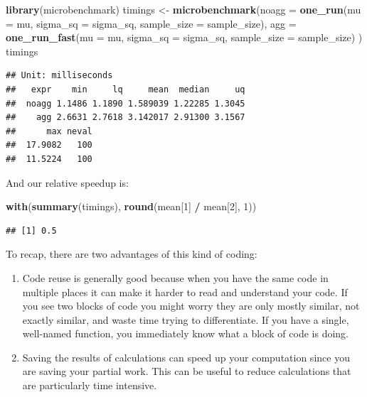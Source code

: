 \documentclass[
]{book}
\newenvironment{Shaded}{\begin{snugshade}}{\end{snugshade}}
\newcommand{\AttributeTok}[1]{\textcolor[rgb]{0.13,0.29,0.53}{#1}}
\newcommand{\DecValTok}[1]{\textcolor[rgb]{0.00,0.00,0.81}{#1}}
\newcommand{\FunctionTok}[1]{\textcolor[rgb]{0.13,0.29,0.53}{\textbf{#1}}}
\newcommand{\NormalTok}[1]{#1}
\newcommand{\OtherTok}[1]{\textcolor[rgb]{0.56,0.35,0.01}{#1}}
\newcommand{\SpecialCharTok}[1]{\textcolor[rgb]{0.81,0.36,0.00}{\textbf{#1}}}
\begin{document}
\begin{Shaded}
\begin{Highlighting}[]
\FunctionTok{library}\NormalTok{(microbenchmark)}
\NormalTok{timings }\OtherTok{\textless{}{-}} \FunctionTok{microbenchmark}\NormalTok{(}\AttributeTok{noagg =} \FunctionTok{one\_run}\NormalTok{(}\AttributeTok{mu =}\NormalTok{ mu, }\AttributeTok{sigma\_sq =}\NormalTok{ sigma\_sq, }
                                          \AttributeTok{sample\_size =}\NormalTok{ sample\_size),}
                          \AttributeTok{agg =} \FunctionTok{one\_run\_fast}\NormalTok{(}\AttributeTok{mu =}\NormalTok{ mu, }\AttributeTok{sigma\_sq =}\NormalTok{ sigma\_sq, }
                                             \AttributeTok{sample\_size =}\NormalTok{ sample\_size) )}
\NormalTok{timings}
\end{Highlighting}
\end{Shaded}

\begin{verbatim}
## Unit: milliseconds
##   expr    min     lq     mean  median     uq
##  noagg 1.1486 1.1890 1.589039 1.22285 1.3045
##    agg 2.6631 2.7618 3.142017 2.91300 3.1567
##      max neval
##  17.9082   100
##  11.5224   100
\end{verbatim}

And our relative speedup is:

\begin{Shaded}
\begin{Highlighting}[]
\FunctionTok{with}\NormalTok{(}\FunctionTok{summary}\NormalTok{(timings), }\FunctionTok{round}\NormalTok{(mean[}\DecValTok{1}\NormalTok{] }\SpecialCharTok{/}\NormalTok{ mean[}\DecValTok{2}\NormalTok{], }\DecValTok{1}\NormalTok{))}
\end{Highlighting}
\end{Shaded}

\begin{verbatim}
## [1] 0.5
\end{verbatim}

To recap, there are two advantages of this kind of coding:

\begin{enumerate}
\def\labelenumi{\arabic{enumi}.}
\item
  Code reuse is generally good because when you have the same code in multiple places it can make it harder to read and understand your code. If you see two blocks of code you might worry they are only mostly similar, not exactly similar, and waste time trying to differentiate. If you have a single, well-named function, you immediately know what a block of code is doing.
\item
  Saving the results of calculations can speed up your computation since you are saving your partial work. This can be useful to reduce calculations that are particularly time intensive.
\end{enumerate}
\end{document}
